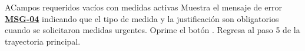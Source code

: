 \begin{UCtrayectoriaA}{A}{Campos requeridos vacíos con medidas activas}
	\UCpaso Muestra el mensaje de error \hyperlink{mMSG04}{\bf MSG-04} indicando que el tipo de medida y la justificación son obligatorios cuando se solicitaron medidas urgentes.
	\UCpaso[\UCactor] Oprime el botón .
	\UCpaso Regresa al paso 5 de la trayectoria principal.
\end{UCtrayectoriaA}

